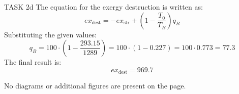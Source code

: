 TASK 2d  
The equation for the exergy destruction is written as:  
\[
ex_{\text{dest}} = -ex_{\text{str}} + \left(1 - \frac{T_0}{T_B}\right) q_B
\]  
Substituting the given values:  
\[
q_B = 100 \cdot \left(1 - \frac{293.15}{1289}\right) = 100 \cdot (1 - 0.227) = 100 \cdot 0.773 = 77.3
\]  
The final result is:  
\[
ex_{\text{dest}} = 969.7
\]  

No diagrams or additional figures are present on the page.